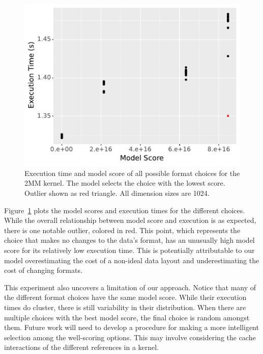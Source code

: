\documentclass[sigconf,review=true]{acmart}
\begin{document}
\begin{figure}
	\includegraphics[width=\columnwidth]{2mm-all.pdf}
	\caption{Execution time and model score of all possible format choices for the 2MM kernel. The model selects the choice with the lowest score. Outlier shown as red triangle. All dimension sizes are 1024.}
	\label{2MMAllChoices}
\end{figure}


Figure~\ref{2MMAllChoices} plots the model scores and execution times for the different choices. 
While the overall relationship between model score and execution is as expected, there is one notable outlier, colored in red.
This point, which represents the choice that makes no changes to the data's format, has an unusually high model score for its relatively low execution time. 
This is potentially attributable to our model overestimating the cost of a non-ideal data layout and underestimating the cost of changing formats. 

This experiment also uncovers a limitation of our approach.
Notice that many of the different format choices have the same model score.
While their execution times do cluster, there is still variability in their distribution.
When there are multiple choices with   the best model score, the final choice is random amongst them.
Future work will need to develop a procedure for making a more intelligent selection among the well-scoring options. 
This may involve considering the cache interactions of the different references in a kernel. 
\end{document}
